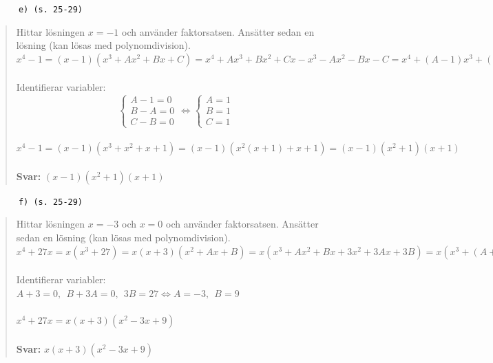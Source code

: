 \documentclass[a4paper]{article}
\newcommand{\tskcol}[1]{\textcolor{tskcol}{#1}}
\begin{document}
	\texttt{\tskcol{~~~~~~e) (s. 25-29)}}
	\begin{quotation}
		\noindent
		Hittar lösningen $x=-1$ och använder faktorsatsen. Ansätter sedan en lösning (kan lösas med polynomdivision). \\
		$x^4-1=(x-1)(x^3+Ax^2+Bx+C)=x^4+Ax^3+Bx^2+Cx-x^3-Ax^2-Bx-C=x^4+(A-1)x^3+(B-A)x^2+(C-B)x-C$ \\ \\
		Identifierar variabler: \\
		\[\begin{cases}
		A-1=0 \\
		B-A=0 \\
		C-B=0
		\end{cases}
		\Leftrightarrow
		\begin{cases}
		A=1 \\
		B=1 \\
		C=1
		\end{cases}\] \\
		$x^4-1=(x-1)(x^3+x^2+x+1)=(x-1)(x^2(x+1)+x+1)=(x-1)(x^2+1)(x+1)$
		\\ \\
		\textbf{Svar:} $(x-1)(x^2+1)(x+1)$
	\end{quotation}
	
	\texttt{\tskcol{~~~~~~f) (s. 25-29)}}
	\begin{quotation}
		\noindent
		Hittar lösningen $x=-3$ och $x=0$ och använder faktorsatsen. Ansätter sedan en lösning (kan lösas med polynomdivision). \\
		$x^4+27x=x(x^3+27)=x(x+3)(x^2+Ax+B)=x(x^3+Ax^2+Bx+3x^2+3Ax+3B)=x(x^3+(A+3)x^2+(B+3A)x+3B)$ \\ \\
		Identifierar variabler: \\
		$A+3=0,~~B+3A=0,~~3B=27 \Leftrightarrow A=-3,~~B=9$ \\ \\
		$x^4+27x=x(x+3)(x^2-3x+9)$
		\\ \\
		\textbf{Svar:} $x(x+3)(x^2-3x+9)$
	\end{quotation}
	
\end{document}
